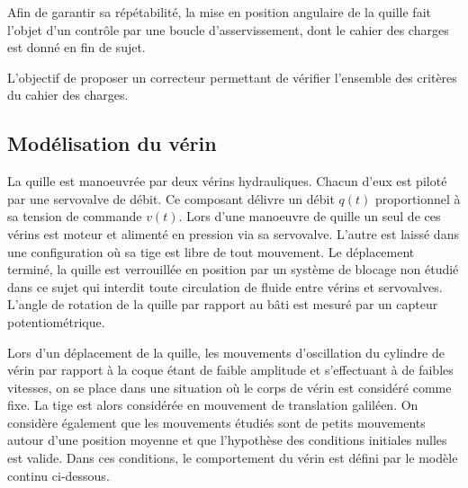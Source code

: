 \documentclass[10pt,fleqn]{article} %
\begin{document}
\begin{multicols}{2}
Afin de garantir sa répétabilité, la mise en position angulaire de la quille fait l’objet d’un contrôle par une boucle d’asservissement, dont le cahier des charges est donné en fin de sujet.
%
\fi


\begin{obj}
L'objectif de proposer un correcteur permettant de vérifier l'ensemble des critères du cahier des charges. 

\end{obj}
\subsection*{Modélisation du vérin}

\ifprof
\else
La quille est manoeuvrée par deux vérins hydrauliques. Chacun d’eux est piloté par une servovalve de débit. Ce composant délivre un débit $q(t)$ proportionnel à sa tension de commande $v(t)$. Lors d’une manoeuvre de quille un seul de ces vérins est moteur et alimenté en pression via sa servovalve. L’autre est laissé dans une configuration où sa tige est libre de tout mouvement. Le déplacement terminé, la quille est verrouillée en position par un système de blocage non étudié dans ce sujet qui interdit toute circulation de fluide entre vérins et servovalves. L’angle de rotation de la quille par rapport au bâti est mesuré par un capteur potentiométrique.


Lors d’un déplacement de la quille, les mouvements d’oscillation du cylindre de vérin par rapport à la coque étant de faible amplitude et s’effectuant à de faibles vitesses, on se place dans une situation où le corps de vérin est considéré comme fixe. La tige est alors considérée en mouvement de translation galiléen.
On considère également que les mouvements étudiés sont de petits mouvements autour d’une position moyenne et que l’hypothèse des conditions initiales nulles est valide. Dans ces conditions, le comportement du vérin est défini par le modèle continu ci-dessous.


\end{multicols}
\end{document}
